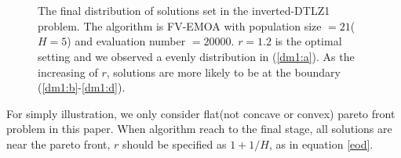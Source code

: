 \documentclass[conference]{IEEEtran}
\begin{document}
\begin{figure}[!t]
  \centering
  \quad
  \\
  \quad
  \\
  \caption{The final distribution of solutions set in the inverted-DTLZ1 problem.
  The algorithm is FV-EMOA with population size $=21$($H=5$) and evaluation number $=20000$.
  $r=1.2$ is the optimal setting and we observed a evenly distribution in (\ref{dm1:a}).
  As the increasing of $r$, solutions are more likely to be at the boundary
  (\ref{dm1:b}-\ref{dm1:d}). 
  }
  \label{dm1}
\end{figure}

For simply illustration, we only consider flat(not concave or convex) pareto front problem
in this paper.
When algorithm reach to the final stage, all solutions are near the pareto front, $r$ should
be specified as $1+1/H$, as in equation \ref{eod}. 
\end{document}

